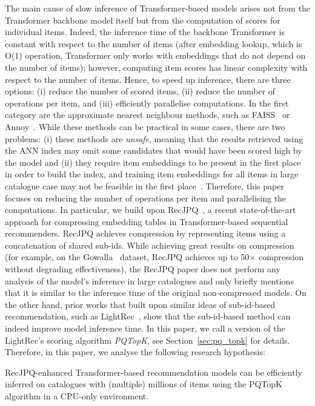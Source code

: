 \documentclass[sigconf,natbib=true, review=true]{acmart} %
\newcommand{\rsasha}[1]{\textcolor[HTML]{FF0000}{#1}}
\begin{document}
The main cause of slow inference of Transformer-based models arises not from the Transformer backbone model itself but from the computation of scores for individual items. Indeed, the inference time of the backbone Transformer is constant with respect to the number of items \rsasha{(after embedding lookup, which is O(1) operation, Transformer only works with embeddings that do not depend on the number of items)}; however, computing item scores has linear complexity with respect to the number of items. Hence, to speed up inference, there are three options: (i) reduce the number of scored items, (ii) reduce the number of operations per item, and (iii) efficiently parallelise computations. 
%
In the first category are the approximate nearest neighbour methods, such as FAISS~\cite{FAISS} or Annoy~\cite{SpotifyAnnoy2024}. While these methods can be practical in some cases, there are two problems: (i) these methods are \emph{unsafe}, meaning that the results retrieved using the ANN index may omit some candidates that would have been scored high by the model and (ii) they require item embeddings to be present in the first place in order to build the index, and training item embeddings for all items in large catalogue case may not be feasible in the first place~\cite{petrovRecJPQTrainingLargeCatalogue2024}.
%
Therefore, this paper focuses on reducing the number of operations per item and parallelising the computations. In particular, we build upon RecJPQ~\cite{petrovRecJPQTrainingLargeCatalogue2024}, a recent state-of-the-art approach for compressing embedding tables in Transformer-based sequential recommenders. RecJPQ achieves compression by representing items using a concatenation of shared sub-ids. While achieving great results on compression (for example, on the Gowalla~\cite{g} dataset, RecJPQ achieves up to 50$\times$ compression without degrading effectiveness), the RecJPQ paper does not perform any analysis of the model's inference in large catalogues and only briefly mentions that it is similar to the inference time of the original non-compressed models. On the other hand, prior works that built upon similar ideas of sub-id-based recommendation, such as LightRec~\cite{lianLightRecMemorySearchEfficient2020}, show that the sub-id-based method can indeed improve model inference time. \rsasha{In this paper, we call a version of the LightRec's scoring algorithm \textit{PQTopK}, see Section~\ref{sec:pq_topk} for details.} Therefore, in this paper, we analyse the following research hypothesis:
\begin{tcolorbox}[enhanced, drop shadow, title={Hypothesis H1}]

\label{hyp:h0}
    RecJPQ-enhanced Transformer-based recommendation models can be efficiently inferred on catalogues with (multiple) millions of items using the PQTopK algorithm in a CPU-only environment. 
\end{tcolorbox}
\end{document}
